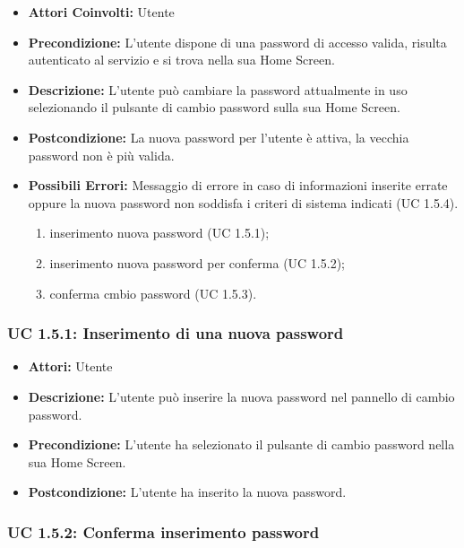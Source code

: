 \begin{itemize}
    \item \textbf{Attori Coinvolti:} Utente
    \item \textbf{Precondizione:} L'utente dispone di una password di accesso valida, risulta autenticato al servizio e si trova nella sua Home Screen.
    \item \textbf{Descrizione:} L'utente può cambiare la password attualmente in uso selezionando il pulsante di cambio password sulla sua Home Screen.
    \item \textbf{Postcondizione:} La nuova password per l'utente è attiva, la vecchia password non è più valida.
    \item \textbf{Possibili Errori:} Messaggio di errore in caso di informazioni inserite errate oppure la nuova password non soddisfa i criteri di sistema indicati (UC 1.5.4).

    \begin{enumerate}
        \item inserimento nuova password (UC 1.5.1);
        \item inserimento nuova password per conferma (UC 1.5.2);
        \item conferma cmbio password (UC 1.5.3).
    \end{enumerate}

\end{itemize}

\subsubsection{UC 1.5.1: Inserimento di una nuova password}

\begin{itemize}
    \item \textbf{Attori:} Utente
    \item \textbf{Descrizione:} L'utente può inserire la nuova password nel pannello di cambio password.
    \item \textbf{Precondizione:} L'utente ha selezionato il pulsante di cambio password nella sua Home Screen.
    \item \textbf{Postcondizione:} L'utente ha inserito la nuova password.
\end{itemize}

\subsubsection{UC 1.5.2: Conferma inserimento password }


